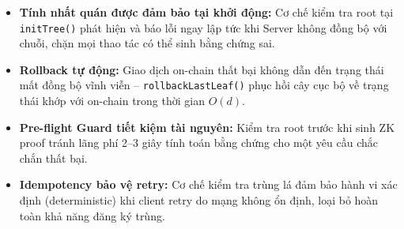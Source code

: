 \documentclass[../DoAn.tex]{subfiles}
\begin{document}
\begin{itemize}
    \item \textbf{Tính nhất quán được đảm bảo tại khởi động:} Cơ chế kiểm tra root tại \texttt{initTree()} phát hiện và báo lỗi ngay lập tức khi Server không đồng bộ với chuỗi, chặn mọi thao tác có thể sinh bằng chứng sai.

    \item \textbf{Rollback tự động:} Giao dịch on-chain thất bại không dẫn đến trạng thái mất đồng bộ vĩnh viễn -- \texttt{rollbackLastLeaf()} phục hồi cây cục bộ về trạng thái khớp với on-chain trong thời gian $O(d)$.

    \item \textbf{Pre-flight Guard tiết kiệm tài nguyên:} Kiểm tra root trước khi sinh ZK proof tránh lãng phí 2--3 giây tính toán bằng chứng cho một yêu cầu chắc chắn thất bại.

    \item \textbf{Idempotency bảo vệ retry:} Cơ chế kiểm tra trùng lá đảm bảo hành vi xác định (deterministic) khi client retry do mạng không ổn định, loại bỏ hoàn toàn khả năng đăng ký trùng.
\end{itemize}
\end{document}
